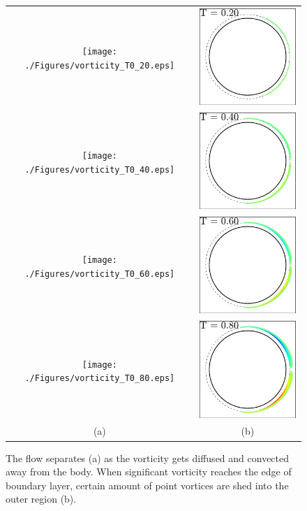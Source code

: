 \begin{figure}
 \begin{center}
 \begin{tabular}{cc}
 \texttt{[image: ./Figures/vorticity\_T0\_20.eps]} &
 \includegraphics[width=5cm]{./Figures/vortices_T0_20.eps}  \\
 \texttt{[image: ./Figures/vorticity\_T0\_40.eps]} &
 \includegraphics[width=5cm]{./Figures/vortices_T0_40.eps}  \\
 \texttt{[image: ./Figures/vorticity\_T0\_60.eps]} &
 \includegraphics[width=5cm]{./Figures/vortices_T0_60.eps}  \\
 \texttt{[image: ./Figures/vorticity\_T0\_80.eps]} &
 \includegraphics[width=5cm]{./Figures/vortices_T0_80.eps}  \\
 (a) & (b)
\end{tabular}
\end{center}
 \caption[Flow separates]{The flow separates (a) as the vorticity gets diffused and convected away from the body. When significant vorticity reaches the edge of boundary layer, certain amount of point vortices are shed into the outer region (b). }
 \label{fig:separation}
\end{figure}


